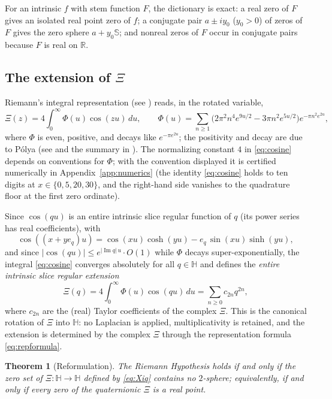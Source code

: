 \documentclass[11pt]{amsart}
\theoremstyle{plain}
\newtheorem{mainthm}{Theorem}
\theoremstyle{definition}
\theoremstyle{remark}
\newcommand{\HH}{\mathbb{H}}
\newcommand{\RR}{\mathbb{R}}
\renewcommand{\SS}{\mathbb{S}}
\newcommand{\im}{\operatorname{Im}}
\newcommand{\dd}{\,d}
\begin{document}
For an intrinsic $f$ with stem function $F$, the dictionary is exact: a real zero of $F$ gives an
isolated real point zero of $f$; a conjugate pair $a\pm iy_0$ ($y_0>0$) of zeros of $F$ gives the
zero sphere $a+y_0\SS$; and nonreal zeros of $F$ occur in conjugate pairs because $F$ is real on
$\RR$.

\subsection{The extension of \texorpdfstring{$\Xi$}{Xi}}
Riemann's integral representation (see \cite[\S10.1]{Titchmarsh1986}) reads, in the rotated
variable,
\begin{equation}\label{eq:cosine}
\Xi(z)=4\int_0^\infty\Phi(u)\cos(zu)\dd u,\qquad
\Phi(u)=\sum_{n\ge1}\bigl(2\pi^2n^4e^{9u/2}-3\pi n^2e^{5u/2}\bigr)e^{-\pi n^2e^{2u}},
\end{equation}
where $\Phi$ is even, positive, and decays like $e^{-\pi e^{2u}}$; the positivity and decay are due
to P\'olya (see \cite{Polya1926,Polya1927} and the summary in
\cite[Theorem~A]{CsordasNorfolkVarga1986}). The normalizing constant $4$ in \eqref{eq:cosine}
depends on conventions for $\Phi$; with the convention displayed it is certified numerically in
Appendix~\ref{app:numerics} (the identity \eqref{eq:cosine} holds to ten digits at
$x\in\{0,5,20,30\}$, and the right-hand side vanishes to the quadrature floor at the first zero
ordinate).

Since $\cos(qu)$ is an entire intrinsic slice regular function of $q$ (its power series has real
coefficients), with
\[
\cos((x+ye_q)u)=\cos(xu)\cosh(yu)-e_q\,\sin(xu)\sinh(yu),
\]
and since $|\cos(qu)|\le e^{|\im q|\,u}\cdot O(1)$ while $\Phi$ decays super-exponentially, the
integral \eqref{eq:cosine} converges absolutely for all $q\in\HH$ and defines the \emph{entire
intrinsic slice regular extension}
\begin{equation}\label{eq:Xiq}
\Xi(q)=4\int_0^\infty\Phi(u)\cos(qu)\dd u=\sum_{n\ge0}c_{2n}q^{2n},
\end{equation}
where $c_{2n}$ are the (real) Taylor coefficients of the complex $\Xi$. This is the canonical
rotation of $\Xi$ into $\HH$: no Laplacian is applied, multiplicativity is retained, and the
extension is determined by the complex $\Xi$ through the representation formula
\eqref{eq:repformula}.

\begin{mainthm}[Reformulation]\label{thm:reformulation}
The Riemann Hypothesis holds if and only if the zero set of $\Xi\colon\HH\to\HH$ defined by
\eqref{eq:Xiq} contains no $2$-sphere; equivalently, if and only if every zero of the quaternionic
$\Xi$ is a real point.
\end{mainthm}
\end{document}
